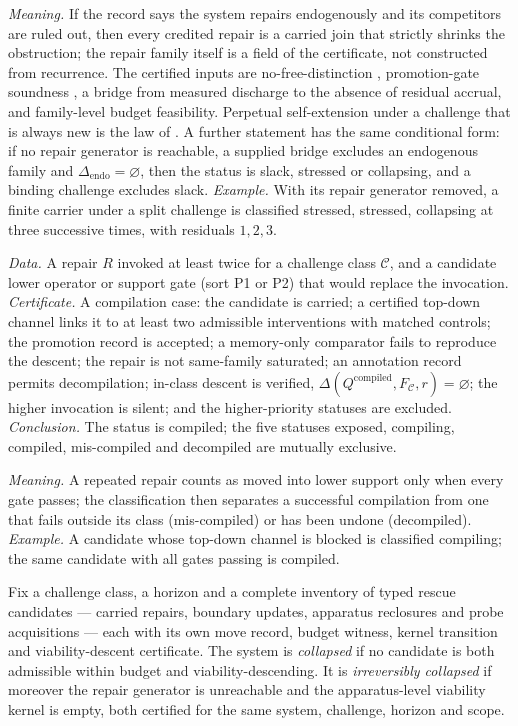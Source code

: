 \emph{Meaning.} If the record says the system repairs endogenously and its competitors are ruled out,
then every credited repair is a carried join that strictly shrinks the obstruction; the repair family
itself is a field of the certificate, not constructed from recurrence. The certified inputs are
no-free-distinction \citep{Tsiokos2026FoundIV}, promotion-gate soundness \citep{Tsiokos2026FoundIII},
a bridge from measured discharge to the absence of residual accrual, and family-level budget
feasibility. Perpetual self-extension under a challenge that is always new is the law of
. A further statement has the same conditional form: if no repair generator is reachable, a supplied bridge excludes an
endogenous family and $\Delta_{\mathrm{endo}} = \varnothing$, then the status is slack, stressed or
collapsing, and a binding challenge excludes slack.
\emph{Example.} With its repair generator removed, a finite carrier under a split challenge is
classified stressed, stressed, collapsing at three successive times, with residuals $1, 2, 3$.

\begin{schema}\label{tmpl:e4}
\emph{Data.} A repair $R$ invoked at least twice for a challenge class $\mathcal C$, and a candidate
lower operator or support gate (sort P1 or P2) that would replace the invocation.
\emph{Certificate.} A compilation case: the candidate is carried; a certified top-down channel links
it to at least two admissible interventions with matched controls; the promotion record is accepted;
a memory-only comparator fails to reproduce the descent; the repair is not same-family saturated; an
annotation record permits decompilation; in-class descent is verified,
$\Delta(Q^{\mathrm{compiled}}, F_{\mathcal C}, r) = \varnothing$; the higher invocation is silent;
and the higher-priority statuses are excluded.
\emph{Conclusion.} The status is compiled; the five statuses exposed, compiling, compiled,
mis-compiled and decompiled are mutually exclusive.
\end{schema}

\emph{Meaning.} A repeated repair counts as moved into lower support only when every gate passes;
the classification then separates a successful compilation from one that fails outside its class
(mis-compiled) or has been undone (decompiled).
\emph{Example.} A candidate whose top-down channel is blocked is classified compiling; the same
candidate with all gates passing is compiled.

\begin{definition}\label{def:e5}
Fix a challenge class, a horizon and a complete inventory of typed rescue candidates --- carried
repairs, boundary updates, apparatus reclosures and probe acquisitions --- each with its own move
record, budget witness, kernel transition and viability-descent certificate. The system is
\emph{collapsed} if no candidate is both admissible within budget and viability-descending. It is
\emph{irreversibly collapsed} if moreover the repair generator is unreachable and the apparatus-level
viability kernel is empty, both certified for the same system, challenge, horizon and scope.
\end{definition}

